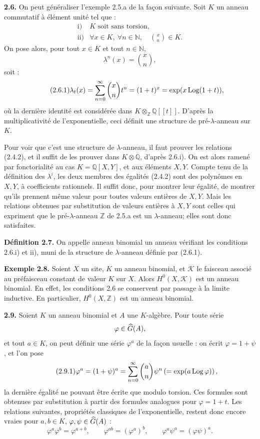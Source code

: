 \documentclass[11pt]{article}
\begin{document}
\textbf{2.6.} On peut généraliser l'exemple 2.5.a de la façon suivante. Soit \(K\) un anneau commutatif à élément unité tel que :
\[
\begin{array}{ll}
\text{i)}& K\text{ soit sans torsion},\\
\text{ii)}& \forall x\in K,\ \forall n\in\mathbb N,\quad \binom{x}{n}\in K.
\end{array}
\]
On pose alors, pour tout \(x\in K\) et tout \(n\in\mathbb N\),
\[
  \lambda^n(x)=\binom{x}{n},
\]
soit :
\begin{equation}\tag{2.6.1}
  \lambda_t(x)=\sum_{n=0}^{\infty}\binom{x}{n}t^n
  =(1+t)^x=\exp(x\operatorname{Log}(1+t)),
\end{equation}
où la dernière identité est considérée dans \(K\otimes_{\mathbb Z}\mathbb Q[[t]]\). D'après la multiplicativité de l'exponentielle, ceci définit une structure de pré-\(\lambda\)-anneau sur \(K\).

Pour voir que c'est une structure de \(\lambda\)-anneau, il faut prouver les relations (2.4.2), et il suffit de les prouver dans \(K\otimes\mathbb Q\), d'après 2.6.i). On est alors ramené par fonctorialité au cas \(K=\mathbb Q[X,Y]\), et aux éléments \(X,Y\). Compte tenu de la définition des \(\lambda^i\), les deux membres des égalités (2.4.2) sont des polynômes en \(X,Y\), à coefficients rationnels. Il suffit donc, pour montrer leur égalité, de montrer qu'ils prennent même valeur pour toutes valeurs entières de \(X,Y\). Mais les relations obtenues par substitution de valeurs entières à \(X,Y\) sont celles qui expriment que le pré-\(\lambda\)-anneau \(\mathbb Z\) de 2.5.a est un \(\lambda\)-anneau; elles sont donc satisfaites.

\textbf{Définition 2.7.} On appelle anneau binomial un anneau vérifiant les conditions 2.6.i) et ii), muni de la structure de \(\lambda\)-anneau définie par (2.6.1).

\textbf{Exemple 2.8.} Soient \(X\) un site, \(K\) un anneau binomial, et \(\mathcal K\) le faisceau associé au préfaisceau constant de valeur \(K\) sur \(X\). Alors \(H^0(X,\mathcal K)\) est un anneau binomial. En effet, les conditions 2.6 se conservent par passage à la limite inductive. En particulier, \(H^0(X,\mathbb Z)\) est un anneau binomial.

\textbf{2.9.} Soient \(K\) un anneau binomial et \(A\) une \(K\)-algèbre. Pour toute série
\[
  \varphi\in\widehat G(A),
\]
et tout \(a\in K\), on peut définir une série \(\varphi^a\) de la façon usuelle : on écrit \(\varphi=1+\psi\), et l'on pose
\begin{equation}\tag{2.9.1}
  \varphi^a=(1+\psi)^a
  =
  \sum_{n=0}^{\infty}\binom{a}{n}\psi^n
  \left(=\exp(a\operatorname{Log}\varphi)\right),
\end{equation}
la dernière égalité ne pouvant être écrite que modulo torsion. Ces formules sont obtenues par substitution à partir des formules analogues pour \(\varphi=1+t\). Les relations suivantes, propriétés classiques de l'exponentielle, restent donc encore vraies pour \(a,b\in K\), \(\varphi,\psi\in\widehat G(A)\) :
\begin{equation}\tag{2.9.2}
  \varphi^a\varphi^b=\varphi^{a+b},\qquad
  \varphi^{ab}=(\varphi^a)^b,\qquad
  \varphi^a\psi^a=(\varphi\psi)^a .
\end{equation}
\end{document}
